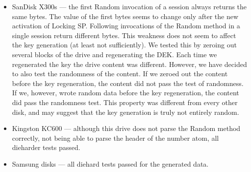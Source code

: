 \begin{itemize}
    \item SanDisk X300s --- the first Random invocation of a session always returns the same bytes. The value of the first bytes seems to change only after the new activation of Locking SP. Following invocations of the Random method in a single session return different bytes. This weakness does not seem to affect the key generation (at least not sufficiently). We tested this by zeroing out several blocks of the drive and regenerating the DEK. Each time we regenerated the key the drive content was different. However, we have decided to also test the randomness of the content. If we zeroed out the content before the key regeneration, the content did not pass the test of randomness. If we, however, wrote random data before the key regeneration, the content did pass the randomness test. This property was different from every other disk, and may suggest that the key generation is truly not entirely random.
    \item Kingston KC600 --- although this drive does not parse the Random method correctly, not being able to parse the header of the number atom, 
all dieharder tests passed.
    \item Samsung disks --- all diehard tests passed for the generated data.
\end{itemize}

